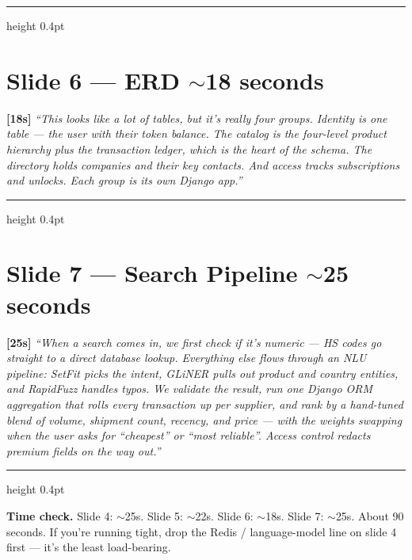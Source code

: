 \documentclass[11pt,a4paper]{article}
\newcommand{\beat}[1]{\textcolor{accent}{\textbf{[#1]}}}
\begin{document}
\vspace{0.5em}
\hrule height 0.4pt
\vspace{0.5em}

\section*{Slide 6 --- ERD \quad \normalsize\textcolor{rulegrey}{$\sim$18 seconds}}

\beat{18s}
\textit{``This looks like a lot of tables, but it's really four groups. Identity is one table --- the user with their token balance. The catalog is the four-level product hierarchy plus the transaction ledger, which is the heart of the schema. The directory holds companies and their key contacts. And access tracks subscriptions and unlocks. Each group is its own Django app.''}

\vspace{0.5em}
\hrule height 0.4pt
\vspace{0.5em}

\section*{Slide 7 --- Search Pipeline \quad \normalsize\textcolor{rulegrey}{$\sim$25 seconds}}

\beat{25s}
\textit{``When a search comes in, we first check if it's numeric --- HS codes go straight to a direct database lookup. Everything else flows through an NLU pipeline: SetFit picks the intent, GLiNER pulls out product and country entities, and RapidFuzz handles typos. We validate the result, run one Django ORM aggregation that rolls every transaction up per supplier, and rank by a hand-tuned blend of volume, shipment count, recency, and price --- with the weights swapping when the user asks for ``cheapest'' or ``most reliable''. Access control redacts premium fields on the way out.''}

\vspace{0.8em}
\hrule height 0.4pt
\vspace{0.6em}

\begin{stagebox}
\textbf{Time check.} Slide 4: $\sim$25s. Slide 5: $\sim$22s. Slide 6: $\sim$18s. Slide 7: $\sim$25s. About 90 seconds. If you're running tight, drop the Redis / language-model line on slide 4 first --- it's the least load-bearing.
\end{stagebox}
\end{document}
